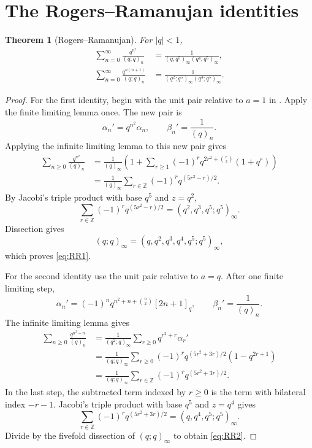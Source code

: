 \documentclass[11pt,oneside,openany]{book}
\newtheorem{theorem}{Theorem}[chapter]
\theoremstyle{definition}
\theoremstyle{remark}
\newcommand{\Z}{\mathbb Z}
\newcommand{\abs}[1]{\lvert #1\rvert}
\begin{document}
\section{The Rogers--Ramanujan identities}

\begin{theorem}[Rogers--Ramanujan]\label{thm:rogers-ramanujan}
For $\abs q<1$,
\begin{align}
 \sum_{n=0}^{\infty}\frac{q^{n^2}}{(q;q)_n}
 &=\frac1{(q;q^5)_\infty(q^4;q^5)_\infty},\label{eq:RR1}\\
 \sum_{n=0}^{\infty}\frac{q^{n(n+1)}}{(q;q)_n}
 &=\frac1{(q^2;q^5)_\infty(q^3;q^5)_\infty}.
 \label{eq:RR2}
\end{align}
\end{theorem}

\begin{proof}
For the first identity, begin with the unit pair relative to $a=1$ in .  Apply the finite limiting lemma once.  The new pair is
\[
 \alpha_n'=q^{n^2}\alpha_n,
 \qquad
 \beta_n'=\frac1{(q)_n}.
\]  Applying the infinite limiting lemma to this new pair gives
\begin{align*}
 \sum_{n\ge0}\frac{q^{n^2}}{(q)_n}
 &=\frac1{(q)_\infty}
 \left(1+\sum_{r\ge1}(-1)^r
 q^{2r^2+\binom r2}(1+q^r)\right)\\
 &=\frac1{(q)_\infty}
 \sum_{r\in\Z}(-1)^rq^{(5r^2-r)/2}.
\end{align*}
By Jacobi's triple product with base $q^5$ and $z=q^2$,
\[
 \sum_{r\in\Z}(-1)^rq^{(5r^2-r)/2}
 =(q^2,q^3,q^5;q^5)_\infty.
\]
Dissection gives
\[
 (q;q)_\infty=(q,q^2,q^3,q^4,q^5;q^5)_\infty,
\]
which proves \eqref{eq:RR1}.

For the second identity use the unit pair relative to $a=q$.  After one finite limiting step,
\[
 \alpha_n'=(-1)^nq^{n^2+n+\binom n2}[2n+1]_q,
 \qquad
 \beta_n'=\frac1{(q)_n}.
\]
The infinite limiting lemma gives
\begin{align*}
 \sum_{n\ge0}\frac{q^{n^2+n}}{(q)_n}
 &=\frac1{(q^2;q)_\infty}
 \sum_{r\ge0}q^{r^2+r}\alpha_r'\\
 &=\frac1{(q;q)_\infty}
 \sum_{r\ge0}(-1)^rq^{(5r^2+3r)/2}(1-q^{2r+1})\\
 &=\frac1{(q;q)_\infty}
 \sum_{r\in\Z}(-1)^rq^{(5r^2+3r)/2}.
\end{align*}
In the last step, the subtracted term indexed by $r\ge0$ is the term with bilateral index $-r-1$.  Jacobi's triple product with base $q^5$ and $z=q^4$ gives
\[
 \sum_{r\in\Z}(-1)^rq^{(5r^2+3r)/2}
 =(q,q^4,q^5;q^5)_\infty.
\]
Divide by the fivefold dissection of $(q;q)_\infty$ to obtain \eqref{eq:RR2}.
\end{proof}
\end{document}
